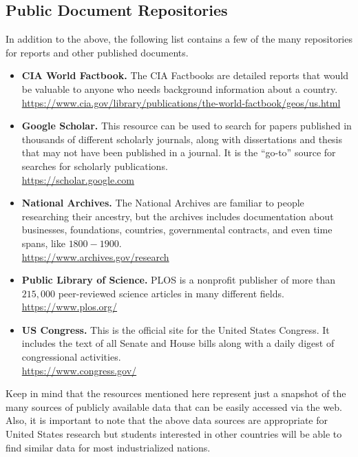 \subsection{Public Document Repositories}

In addition to the above, the following list contains a few of the many repositories for reports and other published documents. 

\begin{itemize}

	\item \textbf{CIA World Factbook.} The CIA Factbooks are detailed reports that would be valuable to anyone who needs background information about a country. 
	\\ \url{https://www.cia.gov/library/publications/the-world-factbook/geos/us.html}

	\item \textbf{Google Scholar.} This resource can be used to search for papers published in thousands of different scholarly journals, along with dissertations and thesis that may not have been published in a journal. It is the ``go-to'' source for searches for scholarly publications.  
	\\ \url{https://scholar.google.com}

	\item \textbf{National Archives.} The National Archives are familiar to people researching their ancestry, but the archives includes documentation about businesses, foundations, countries, governmental contracts, and even time spans, like $ 1800-1900 $. 
	\\ \url{https://www.archives.gov/research}

	\item \textbf{Public Library of Science.} PLOS is a nonprofit publisher of more than $ 215,000 $ peer-reviewed science articles in many different fields.
	\\ \url{https://www.plos.org/}

	\item \textbf{US Congress.} This is the official site for the United States Congress. It includes the text of all Senate and House bills along with a daily digest of congressional activities.
	\\ \url{https://www.congress.gov/}

\end{itemize}

Keep in mind that the resources mentioned here represent just a snapshot of the many sources of publicly available data that can be easily accessed via the web. Also, it is important to note that the above data sources are appropriate for United States research but students interested in other countries will be able to find similar data for most industrialized nations.

